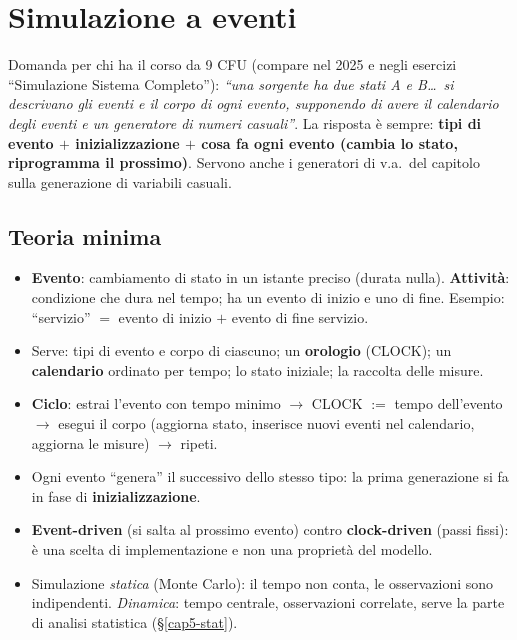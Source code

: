 \chapter{Simulazione a eventi}\label{cap:sim}

\begin{nota}
Domanda per chi ha il corso da 9 CFU (compare nel 2025 e negli esercizi ``Simulazione Sistema Completo''): \emph{``una sorgente ha due stati A e B\dots\ si descrivano gli eventi e il corpo di ogni evento, supponendo di avere il calendario degli eventi e un generatore di numeri casuali''}. La risposta è sempre: \textbf{tipi di evento $+$ inizializzazione $+$ cosa fa ogni evento (cambia lo stato, riprogramma il prossimo)}. Servono anche i generatori di v.a.\ del capitolo sulla generazione di variabili casuali.
\end{nota}

\newcommand{\sched}[2]{\texttt{schedula(#1,\ t+#2)}}
\newcommand{\Exp}[1]{\texttt{Exp(#1)}}

\section{Teoria minima}

\begin{itemize}
\item \textbf{Evento}: cambiamento di stato in un istante preciso (durata nulla). \textbf{Attività}: condizione che dura nel tempo; ha un evento di inizio e uno di fine. Esempio: ``servizio'' $=$ evento di inizio $+$ evento di fine servizio.
\item Serve: tipi di evento e corpo di ciascuno; un \textbf{orologio} (CLOCK); un \textbf{calendario} ordinato per tempo; lo stato iniziale; la raccolta delle misure.
\item \textbf{Ciclo}: estrai l'evento con tempo minimo $\to$ CLOCK $:=$ tempo dell'evento $\to$ esegui il corpo (aggiorna stato, inserisce nuovi eventi nel calendario, aggiorna le misure) $\to$ ripeti.
\item Ogni evento ``genera'' il successivo dello stesso tipo: la prima generazione si fa in fase di \textbf{inizializzazione}.
\item \textbf{Event-driven} (si salta al prossimo evento) contro \textbf{clock-driven} (passi fissi): è una scelta di implementazione e non una proprietà del modello.
\item Simulazione \emph{statica} (Monte Carlo): il tempo non conta, le osservazioni sono indipendenti. \emph{Dinamica}: tempo centrale, osservazioni correlate, serve la parte di analisi statistica (§\ref{cap5-stat}).
\end{itemize}

